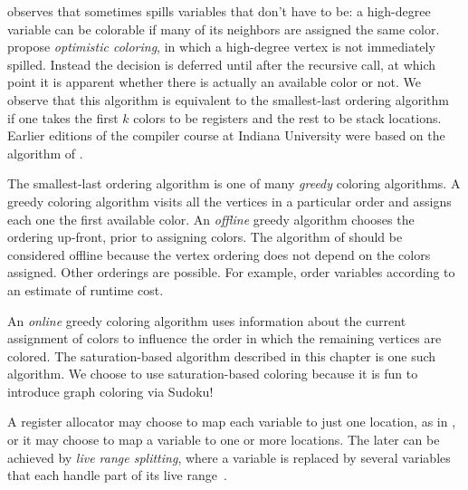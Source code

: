 \documentclass[7x10,nocrop]{TimesAPriori_MIT}%
\begin{document}
\citet{Briggs:1994kx} observes that \citet{Chaitin:1982vn} sometimes
spills variables that don't have to be: a high-degree variable can be
colorable if many of its neighbors are assigned the same color.
\citet{Briggs:1994kx} propose \emph{optimistic coloring}, in which a
high-degree vertex is not immediately spilled. Instead the decision is
deferred until after the recursive call, at which point it is apparent
whether there is actually an available color or not. We observe that
this algorithm is equivalent to the smallest-last ordering
algorithm~\citep{Matula:1972aa} if one takes the first $k$ colors to
be registers and the rest to be stack locations.
Earlier editions of the compiler course at Indiana University
\citep{Dybvig:2010aa} were based on the algorithm of
\citet{Briggs:1994kx}.

The smallest-last ordering algorithm is one of many \emph{greedy}
coloring algorithms. A greedy coloring algorithm visits all the
vertices in a particular order and assigns each one the first
available color. An \emph{offline} greedy algorithm chooses the
ordering up-front, prior to assigning colors. The algorithm of
\citet{Chaitin:1981vl} should be considered offline because the vertex
ordering does not depend on the colors assigned.  Other orderings are
possible. For example, \citet{Chow:1984ys} order variables according
to an estimate of runtime cost.

An \emph{online} greedy coloring algorithm uses information about the
current assignment of colors to influence the order in which the
remaining vertices are colored. The saturation-based algorithm
described in this chapter is one such algorithm. We choose to use
saturation-based coloring because it is fun to introduce graph
coloring via Sudoku!

A register allocator may choose to map each variable to just one
location, as in \citet{Chaitin:1981vl}, or it may choose to map a
variable to one or more locations. The later can be achieved by
\emph{live range splitting}, where a variable is replaced by several
variables that each handle part of its live
range~\citep{Chow:1984ys,Briggs:1994kx,Cooper:1998ly}.



\end{document}
